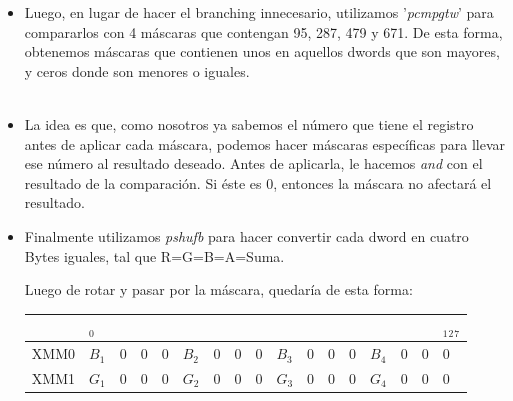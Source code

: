 \documentclass[a4paper]{article}
\begin{document}
\begin{itemize}
\begin{itemize}
\item Luego, en lugar de hacer el branching innecesario, utilizamos '\textit{pcmpgtw}' para compararlos con 4 m\'{a}scaras que contengan 95, 287, 479 y 671. De esta forma, obtenemos m\'{a}scaras que contienen unos en aquellos dwords que son mayores, y ceros donde son menores o iguales. \\
\
\item La idea es que, como nosotros ya sabemos el n\'{u}mero que tiene el registro antes de aplicar 
cada m\'{a}scara, podemos hacer m\'{a}scaras espec\'{i}ficas para llevar ese n\'{u}mero al resultado deseado. Antes de aplicarla, le hacemos \textit{and} con el resultado de la comparaci\'{o}n. Si \'{e}ste es 0, entonces la m\'{a}scara no afectar\'{a} el resultado.\\
\item Finalmente utilizamos \textit{pshufb} para hacer convertir cada dword en cuatro Bytes iguales, tal que R=G=B=A=Suma. \\
\begin{table}[h]
\center
Luego de rotar y pasar por la m\'{a}scara, quedar\'{i}a de esta forma:
\begin{tabular}{lllllllllllllllll}
                           & $_0$                       &                        &                        &                        &                            &                        &                        &                        &                            &                        &                        &                        &                            &                        &                        & $_1$$_2$$_7$                    \\ \hline
\multicolumn{1}{|l|}{XMM0} & \multicolumn{1}{l|}{$B_1$} & \multicolumn{1}{l|}{0} & \multicolumn{1}{l|}{0} & \multicolumn{1}{l|}{0} & \multicolumn{1}{l|}{$B_2$} & \multicolumn{1}{l|}{0} & \multicolumn{1}{l|}{0} & \multicolumn{1}{l|}{0} & \multicolumn{1}{l|}{$B_3$} & \multicolumn{1}{l|}{0} & \multicolumn{1}{l|}{0} & \multicolumn{1}{l|}{0} & \multicolumn{1}{l|}{$B_4$} & \multicolumn{1}{l|}{0} & \multicolumn{1}{l|}{0} & \multicolumn{1}{l|}{0} \\ \hline
\multicolumn{1}{|l|}{XMM1} & \multicolumn{1}{l|}{$G_1$} & \multicolumn{1}{l|}{0} & \multicolumn{1}{l|}{0} & \multicolumn{1}{l|}{0} & \multicolumn{1}{l|}{$G_2$} & \multicolumn{1}{l|}{0} & \multicolumn{1}{l|}{0} & \multicolumn{1}{l|}{0} & \multicolumn{1}{l|}{$G_3$} & \multicolumn{1}{l|}{0} & \multicolumn{1}{l|}{0} & \multicolumn{1}{l|}{0} & \multicolumn{1}{l|}{$G_4$} & \multicolumn{1}{l|}{0} & \multicolumn{1}{l|}{0} & \multicolumn{1}{l|}{0} \\ \hline

\end{tabular}
\end{table}
\end{itemize}
\end{itemize}
\end{document}
